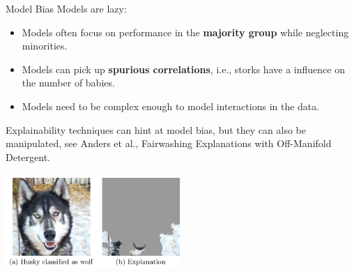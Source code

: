 \begin{vbframe}{Model Bias}
 Models are lazy: 
\begin{itemize}
   \item Models often focus on performance in the \textbf{majority group} while neglecting minorities.
   \item Models can pick up \textbf{spurious correlations}, i.e., storks have a influence on the number of babies.
   \item Models need to be complex enough to model interactions in the data.
\end{itemize}

\begin{footnotesize}
 Explainability techniques can hint at model bias, but they can also be manipulated, see Anders et al., Fairwashing Explanations with Off-Manifold Detergent.
\end{footnotesize}

\begin{center}
     \includegraphics[width=0.5\textwidth]{figure_man/biases-explain.png}
\end{center}

\end{vbframe}

